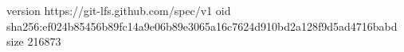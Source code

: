 version https://git-lfs.github.com/spec/v1
oid sha256:ef024b85456b89fc14a9e06b89e3065a16c7624d910bd2a128f9d5ad4716babd
size 216873
